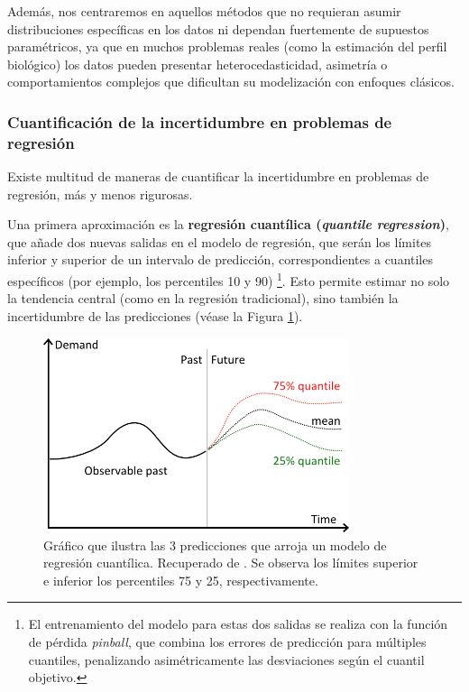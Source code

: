 Además, nos centraremos en aquellos métodos que no requieran asumir distribuciones específicas en los datos
ni dependan fuertemente de supuestos paramétricos, ya que en muchos problemas reales (como la 
estimación del perfil biológico) los datos pueden presentar heterocedasticidad, asimetría o 
comportamientos complejos que dificultan su modelización con enfoques clásicos.


\subsubsection{Cuantificación de la incertidumbre en problemas de regresión}

Existe multitud de maneras de cuantificar la incertidumbre en problemas de regresión, más y menos rigurosas.

Una primera aproximación es la \textbf{regresión cuantílica (\textit{quantile regression})}, que añade dos 
nuevas salidas en el modelo de regresión, que serán los límites inferior y superior de un intervalo de 
predicción, correspondientes a cuantiles específicos (por ejemplo, los percentiles 10 y 90)
\footnote{
    El entrenamiento del modelo para estas dos salidas se realiza con la función de pérdida \textit{pinball},
    \cite{steinwart2011} que combina los errores de predicción para múltiples cuantiles, penalizando
    asimétricamente las desviaciones según el cuantil objetivo.
}. 
Esto permite estimar no solo la tendencia central (como en la regresión tradicional), sino también la 
incertidumbre de las predicciones (véase la Figura \ref{fig:quantile_regression}).

\begin{figure}[h]
    \centering
    \includegraphics[width=0.8\textwidth]{capitulos/cap_02/imagenes/quantile_regression.png}
    \caption[
        Gráfico que ilustra las 3 predicciones que arroja un modelo de regresión cuantílica. Recuperado de 
        \cite{vermorel2012}.
    ]{
        Gráfico que ilustra las 3 predicciones que arroja un modelo de regresión cuantílica. Recuperado de 
        \cite{vermorel2012}. Se observa los límites superior e inferior los percentiles 75 y 25, 
        respectivamente. 
    }
    \label{fig:quantile_regression}
\end{figure}

